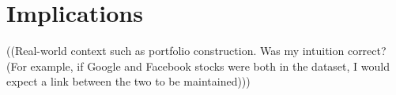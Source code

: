 \section{Implications}
\label{sec:usage:implication}

((Real-world context such as portfolio construction. Was my intuition correct? (For example, if Google and Facebook stocks were both in the dataset, I would expect a link between the two to be maintained)))